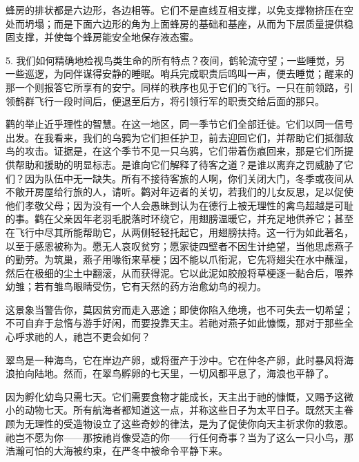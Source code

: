 蜂房的排状都是六边形，各边相等。它们不是直线互相支撑，以免支撑物挤压在空处而坍塌；而是下面六边形的角为上面蜂房的基础和基座，从而为下层质量提供稳固支撑，并使每个蜂房能安全地保存液态蜜。\par

5. 我们如何精确地检视鸟类生命的所有特点？夜间，鹤轮流守望；一些睡觉，另一些巡逻，为同伴谋得安静的睡眠。哨兵完成职责后鸣叫一声，便去睡觉；醒来的那一个则报答它所享有的安宁。同样的秩序也见于它们的飞行。一只在前领路，引领鹤群飞行一段时间后，便退至后方，将引领行军的职责交给后面的那只。\par

鹳的举止近乎理性的智慧。在这一地区，同一季节它们全部迁徙。它们以同一信号出发。在我看来，我们的乌鸦为它们担任护卫，前去迎回它们，并帮助它们抵御敌鸟的攻击。证据是，在这个季节不见一只乌鸦，它们带着伤痕回来，那是它们所提供帮助和援助的明显标志。是谁向它们解释了待客之道？是谁以离弃之罚威胁了它们？因为队伍中无一缺失。所有不接待客旅的人啊，你们关闭大门，冬季或夜间从不敞开房屋给行旅的人，请听。鹳对年迈者的关切，若我们的儿女反思，足以促使他们孝敬父母；因为没有一个人会愚昧到认为在德行上被无理性的禽鸟超越是可耻的事。鹳在父亲因年老羽毛脱落时环绕它，用翅膀温暖它，并充足地供养它；甚至在飞行中尽其所能帮助它，从两侧轻轻托起它，用翅膀扶持。这一行为如此著名，以至于感恩被称为。愿无人哀叹贫穷；愿家徒四壁者不因生计绝望，当他思虑燕子的勤劳。为筑巢，燕子用喙衔来草梗；因不能以爪衔泥，它先将翅尖在水中蘸湿，然后在极细的尘土中翻滚，从而获得泥。它以此泥如胶般将草梗逐一黏合后，喂养幼雏；若有雏鸟眼睛受伤，它有天然的药方治愈幼鸟的视力。\par

这景象当警告你，莫因贫穷而走入恶途；即使你陷入绝境，也不可失去一切希望；不可自弃于怠惰与游手好闲，而要投靠天主。若祂对燕子如此慷慨，那对于那些全心呼求祂的人，祂岂不更会如何？\par

翠鸟是一种海鸟，它在岸边产卵，或将蛋产于沙中。它在仲冬产卵，此时暴风将海浪拍向陆地。然而，在翠鸟孵卵的七天里，一切风都平息了，海浪也平静了。\par

因为孵化幼鸟只需七天。它们需要食物才能成长，天主出于祂的慷慨，又赐予这微小的动物七天。所有航海者都知道这一点，并称这些日子为太平日子。既然天主眷顾为无理性的受造物设立了这些奇妙的律法，是为了促使你向天主祈求你的救恩。祂岂不愿为你——那按祂肖像受造的你——行任何奇事？当为了这么一只小鸟，那浩瀚可怕的大海被约束，在严冬中被命令平静下来。\par

